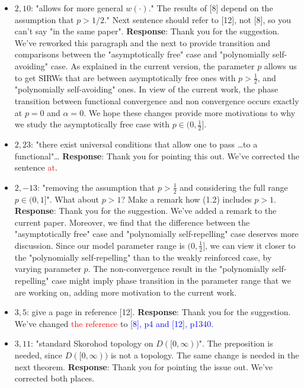 \documentclass[11pt,a4paper]{article}
\numberwithin{equation}{section}
\newcommand{\corr}[2]{We've changed {\textcolor{red}{#1}} to {\textcolor{blue}{#2}}.}
\def\TBF#1{\textcolor{red}{#1}} %
\begin{document}
\begin{itemize}
		\item 
		$2,10$: "allows for more general $w(\cdot)$." The results of [8] depend on the assumption that $p > 1/2.$" Next sentence should refer to [12], not [8], so you can't say "in the same paper".
		\subitem \textbf{Response}: Thank you for the suggestion. We've reworked this paragraph and the next to provide transition and comparisons between the "asymptotically free" case and "polynomially self-avoiding" case. As explained in the current version, the parameter $p$ allows us to get SIRWs that are between asymptotically free ones with $p>\frac{1}{2}$, and "polynomially self-avoiding" ones. In view of the current work, the phase transition between functional convergence and non convergence occurs exactly at $p=0$ and $\alpha =0$. We hope these changes provide more motivations to why we study the asymptotically free case with $p\in(0,\frac{1}{2}]$.
		
		
		\item
		$2,23$: "there exist universal conditions that allow one to pass \dots to a functional"\dots
		\subitem \textbf{Response}: Thank you for pointing this out. We've corrected the sentence \TBF{at}. 
		
		\item
		$2,-13$: "removing the assumption that $p > \frac{1}{2}$ and considering the full range $p\in (0,1]$". What about $p > 1$? Make a remark how (1.2) includes $p > 1$.
		\subitem \textbf{Response}: Thank you for the suggestion. We've added a remark to the current paper. Moreover, we find that the difference between the "asymptotically free" case and "polynomially self-repelling" case deserves more discussion. Since our model parameter range is $(0,\frac{1}{2}]$, we can view it closer to the "polynomially self-repelling" than to the weakly reinforced case, by varying parameter $p$. The non-convergence result in the "polynomially self-repelling" case might imply phase transition in the parameter range that we are working on, adding more motivation to the current work.
		
		
		\item
		$3,5$: give a page in reference [12].
		\subitem \textbf{Response}: Thank you for the suggestion. \corr{the reference }{[8], p4 and [12],
			p1340}
		
		
		\item 
		$3,11$: "standard Skorohod topology on $D([0,\infty))$". The preposition is needed, since $D([0,\infty))$ is not a topology. The same change is needed in the next theorem.
		\subitem \textbf{Response}: Thank you for pointing the issue out. We've corrected both places.
		

\end{itemize}
\end{document}
